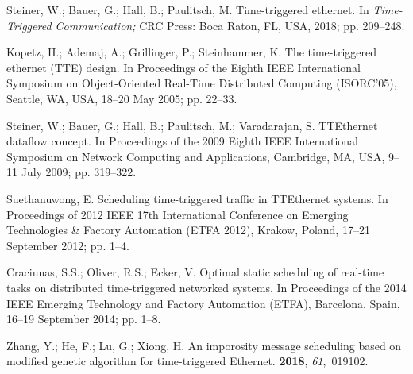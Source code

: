 \documentclass[electronics,article,accept,moreauthors,pdftex]{Definitions/mdpi}
\begin{document}
\begin{thebibliography}{999}
\providecommand{\natexlab}[1]{#1}


Steiner, W.; Bauer, G.; Hall, B.; Paulitsch, M.
\newblock Time-triggered ethernet. In \emph{Time-Triggered Communication;} CRC Press: Boca Raton, FL, USA, 2018; pp. 209--248.%

Kopetz, H.; Ademaj, A.; Grillinger, P.; Steinhammer, K.
\newblock The time-triggered ethernet (TTE) design.
\newblock  In Proceedings of the Eighth IEEE International Symposium on Object-Oriented Real-Time
  Distributed Computing (ISORC'05),  Seattle, WA, USA, 18--20 May 2005; pp. 22--33.%

Steiner, W.; Bauer, G.; Hall, B.; Paulitsch, M.; Varadarajan, S.
\newblock TTEthernet dataflow concept.
\newblock  In Proceedings of the 2009 Eighth IEEE International Symposium on Network Computing and
  Applications, Cambridge, MA, USA,  9--11 July 2009; pp. 319--322.%

Suethanuwong, E.
\newblock Scheduling time-triggered traffic in TTEthernet systems.
\newblock  In Proceedings of 2012 IEEE 17th International Conference on Emerging
  Technologies \& Factory Automation (ETFA 2012), Krakow, Poland, 17--21 September 2012; pp. 1--4. %

Craciunas, S.S.; Oliver, R.S.; Ecker, V.
\newblock Optimal static scheduling of real-time tasks on distributed
  time-triggered networked systems.
\newblock  In Proceedings of the 2014 IEEE Emerging Technology and Factory
  Automation (ETFA),  Barcelona, Spain, 16--19 September 2014; pp. 1--8. %

Zhang, Y.; He, F.; Lu, G.; Xiong, H.
\newblock An imporosity message scheduling based on modified genetic algorithm
  for time-triggered Ethernet.
 {\bf 2018}, {\em
  61},~019102.


\end{thebibliography}
\end{document}
